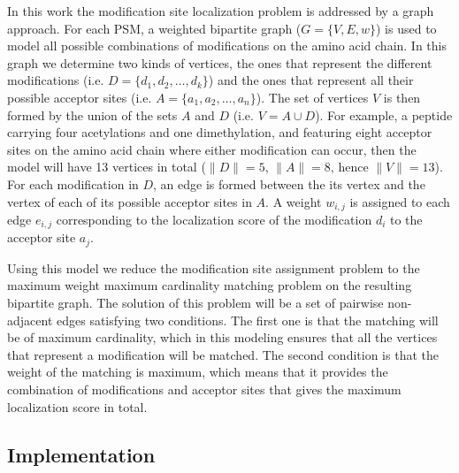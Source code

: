 \documentclass[]{article}
\begin{document}
In this work the modification site localization problem is addressed by a graph approach. For each PSM, a weighted  bipartite graph ($G = \{V,E,w\}$) is used to model all possible combinations of modifications on the amino acid chain. In this graph we determine two kinds of vertices, the ones that represent the different modifications (i.e. $D = \{d_1, d_2, \dots, d_k\}$) and the ones that represent all their possible acceptor sites (i.e. $A = \{a_1, a_2, \dots, a_n\}$). The set of vertices $V$ is then formed by the union of the sets $A$ and $D$ (i.e. $V = A \cup D$). For example, a peptide carrying four acetylations and one dimethylation, and featuring eight acceptor sites on the amino acid chain where either modification can occur, then the model will have 13 vertices in total ($\|D\| = 5$, $\|A\| = 8$, hence $\|V\| = 13$). For each modification in $D$, an edge is formed between the its vertex and the vertex of each of its possible acceptor sites in $A$. A weight $w_{i,j}$ is assigned to each edge $e_{i,j}$ corresponding to the localization score of the modification $d_i$ to the acceptor site $a_j$.

Using this model we reduce the modification site assignment problem to the maximum weight maximum cardinality matching problem on the resulting bipartite graph. The solution of this problem will be a set of pairwise non-adjacent edges satisfying two conditions. The first one is that the matching will be of maximum cardinality, which in this modeling ensures that all the vertices that represent a modification will be matched. The second condition is that the weight of the matching is maximum, which means that it provides the combination of modifications and acceptor sites that gives the maximum localization score in total.


\subsection{Implementation}
\end{document}
